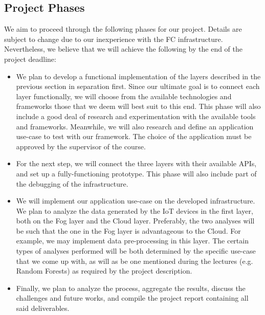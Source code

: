 \documentclass[letterpaper]{article}
\begin{document}
 \subsection{Project Phases}
 We aim to proceed through the following phases for our project. Details are subject to change due to our inexperience with the FC infrastructure. Nevertheless, we believe that we will achieve the following by the end of the project deadline:
 
 \begin{itemize}
     \item We plan to develop a functional implementation of the layers described in the previous section in separation first. Since our ultimate goal is to connect each layer functionally, we will choose from the available technologies and frameworks those that we deem will best suit to this end. This phase will also include a good deal of research and experimentation with the available tools and frameworks. Meanwhile, we will also research and define an application use-case to test with our framework. The choice of the application must be approved by the supervisor of the course.
     \item For the next step, we will connect the three layers with their available APIs, and set up a fully-functioning prototype. This phase will also include part of the debugging of the infrastructure.
     \item We will implement our application use-case on the developed infrastructure. We plan to analyze the data generated by the IoT devices in the first layer, both on the Fog layer and the Cloud layer. Preferably, the two analyses will be such that the one in the Fog layer is advantageous to the Cloud. For example, we may implement data pre-processing in this layer. The certain types of analyses performed will be both determined by the specific use-case that we come up with, as will as be one mentioned during the lectures (e.g. Random Forests) as required by the project description.
     \item Finally, we plan to analyze the process, aggregate the results, discuss the challenges and future works, and compile the project report containing all said deliverables.
 \end{itemize}

 \clearpage


\end{document}
